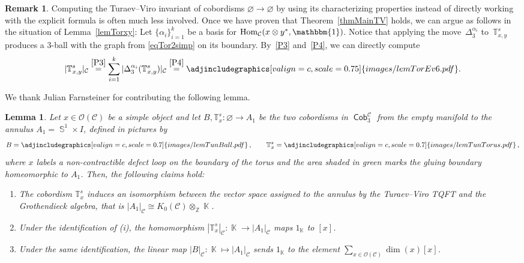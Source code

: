 \documentclass[10pt,a4paper]{amsart}
\DeclareMathOperator{\Hom}{Hom}
\DeclareMathOperator{\K}{\mathbb{K}}
\DeclareMathOperator{\Sp}{\mathbb{S}}
\DeclareMathOperator{\Cob}{\mathsf{Cob}}
\numberwithin{equation}{section}
\newtheorem{Lemma}[Lemma]{Lemma}
\theoremstyle{definition}
\newtheorem{Remark}[Remark]{Remark}
\begin{document}
\begin{Remark} \label{remTorus}
Computing the Turaev--Viro invariant of cobordisms $\varnothing \rightarrow \varnothing$ by using its characterizing properties instead of directly working with the explicit formula is often much less involved. Once we have proven that Theorem~\ref{thmMainTV} holds, we can argue as follows in the situation of Lemma~\ref{lemTorxy}: Let $\{\alpha_i\}_{i = 1}^k$ be a basis for $\Hom_{\mathcal{C}}(x \otimes y^*, \mathbbm{1})$. Notice that applying the move~$\Delta_3^{\alpha_i}$ to~$\mathbb{T}_{x,y}^s$ produces a 3-ball with the graph from \eqref{eqTor2simp} on its boundary. By~\ref{P3} and~\ref{P4}, we can directly compute
 \begin{align*}
 |\mathbb{T}_{x,y}^s|_{\mathcal{C}} \overset{\rm \ref{P3}}{=} \sum_{i = 1}^k|\Delta_3^{\alpha_i} (\mathbb{T}_{x,y}^s )|_{\mathcal{C}} \overset{\rm \ref{P4}}{=} \adjincludegraphics[valign=c, scale = 0.75]{images/lemTorEv6.pdf}.
 \end{align*}
\end{Remark}
We thank Julian Farnsteiner for contributing the following lemma.
\begin{Lemma}
\label{lemProp2}
 Let $x \in \mathcal{O}(\mathcal{C})$ be a simple object and let $B, \mathbb{T}_x^s\colon \varnothing \rightarrow A_1$ be the two cobordisms in $\Cob_3^{\mathcal{C}}$ from the empty manifold to the annulus $A_1 = \Sp^1 \times I$, defined in pictures by
 \begin{align*}
 B = \adjincludegraphics[valign=c, scale = 0.7]{images/lemTunBall.pdf}\,, \qquad \mathbb{T}_x^s = \adjincludegraphics[valign=c, scale = 0.7]{images/lemTunTorus.pdf}\, ,
 \end{align*}
 where $x$ labels a non-contractible defect loop on the boundary of the torus and the area shaded in green marks the gluing boundary homeomorphic to $A_1$. Then, the following claims hold:
 \begin{enumerate}[$(i)$]\itemsep=0pt
 \item The cobordism $\mathbb{T}_x^s$ induces an isomorphism between the vector space assigned to the annulus by the Turaev--Viro TQFT and the Grothendieck algebra, that is $|A_1|_{\mathcal{C}} \cong K_0(\mathcal{C}) \otimes_{\mathbb{Z}} \K$.
 \item Under the identification of (i), the homomorphism $|\mathbb{T}_x^s|_{\mathcal{C}}\colon \K \rightarrow |A_1|_{\mathcal{C}}$ maps $1_{\K}$ to $[x]$.
 \item Under the same identification, the linear map $|B|_{\mathcal{C}}\colon \K \mapsto |A_1|_{\mathcal{C}}$ sends $1_{\K}$ to the element $\sum_{x \in \mathcal{O}(\mathcal{C})}\dim(x) [x]$.

 \end{enumerate}
\end{Lemma}
\end{document}
